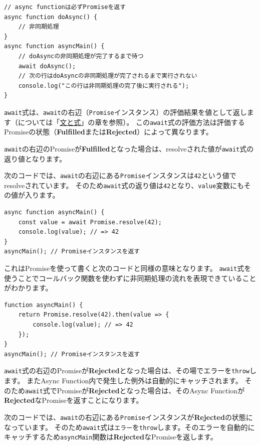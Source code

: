\begin{lstlisting}
// async functionは必ずPromiseを返す
async function doAsync() {
    // 非同期処理
}
async function asyncMain() {
    // doAsyncの非同期処理が完了するまで待つ
    await doAsync();
    // 次の行はdoAsyncの非同期処理が完了されるまで実行されない
    console.log("この行は非同期処理の完了後に実行される");
}
\end{lstlisting}

\texttt{await}式は、\texttt{await}の右辺（\texttt{Promise}インスタンス）の評価結果を値として返します（\textbf{}については「\hyperlink{statement-and-expression}{文と式}」の章を参照）。
この\texttt{await}式の評価方法は評価するPromiseの状態（\textbf{Fulfilled}または\textbf{Rejected}）によって異なります。

\texttt{await}の右辺のPromiseが\textbf{Fulfilled}となった場合は、resolveされた値が\texttt{await}式の返り値となります。

次のコードでは、\texttt{await}の右辺にある\texttt{Promise}インスタンスは\texttt{42}という値でresolveされています。
そのため\texttt{await}式の返り値は\texttt{42}となり、\texttt{value}変数にもその値が入ります。

\begin{lstlisting}
async function asyncMain() {
    const value = await Promise.resolve(42);
    console.log(value); // => 42
}
asyncMain(); // Promiseインスタンスを返す
\end{lstlisting}

これはPromiseを使って書くと次のコードと同様の意味となります。
\texttt{await}式を使うことでコールバック関数を使わずに非同期処理の流れを表現できていることがわかります。

\begin{lstlisting}
function asyncMain() {
    return Promise.resolve(42).then(value => {
        console.log(value); // => 42
    });
}
asyncMain(); // Promiseインスタンスを返す
\end{lstlisting}

\texttt{await}式の右辺のPromiseが\textbf{Rejected}となった場合は、その場でエラーを\texttt{throw}します。
またAsync Function内で発生した例外は自動的にキャッチされます。
そのため\texttt{await}式でPromiseが\textbf{Rejected}となった場合は、そのAsync
Functionが\textbf{Rejected}なPromiseを返すことになります。

次のコードでは、\texttt{await}の右辺にある\texttt{Promise}インスタンスが\textbf{Rejected}の状態になっています。
そのため\texttt{await}式は\texttt{エラー}を\texttt{throw}します。そのエラーを自動的にキャッチするため\texttt{asyncMain}関数は\textbf{Rejected}なPromiseを返します。

